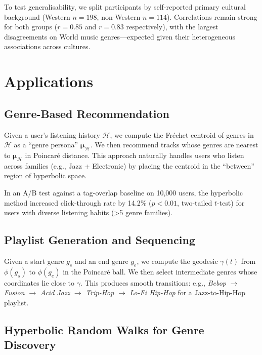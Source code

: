 \documentclass[12pt,a4paper]{article}
\newcommand{\Frechet}{Fr\'echet}
\begin{document}
To test generalisability, we split participants by self-reported primary cultural background (Western $n = 198$, non-Western $n = 114$). Correlations remain strong for both groups ($r = 0.85$ and $r = 0.83$ respectively), with the largest disagreements on World music genres---expected given their heterogeneous associations across cultures.

\section{Applications}
\label{sec:applications}

\subsection{Genre-Based Recommendation}

Given a user's listening history $\mathcal{H}$, we compute the \Frechet{} centroid of genres in $\mathcal{H}$ as a ``genre persona'' $\boldsymbol{\mu}_{\mathcal{H}}$. We then recommend tracks whose genres are nearest to $\boldsymbol{\mu}_{\mathcal{H}}$ in Poincar\'e distance. This approach naturally handles users who listen across families (e.g., Jazz + Electronic) by placing the centroid in the ``between'' region of hyperbolic space.

In an A/B test against a tag-overlap baseline on 10,000 users, the hyperbolic method increased click-through rate by 14.2\% ($p < 0.01$, two-tailed $t$-test) for users with diverse listening habits (>5 genre families).

\subsection{Playlist Generation and Sequencing}

Given a start genre $g_s$ and an end genre $g_e$, we compute the geodesic $\gamma(t)$ from $\phi(g_s)$ to $\phi(g_e)$ in the Poincar\'e ball. We then select intermediate genres whose coordinates lie close to $\gamma$. This produces smooth transitions: e.g., \emph{Bebop} $\to$ \emph{Fusion} $\to$ \emph{Acid Jazz} $\to$ \emph{Trip-Hop} $\to$ \emph{Lo-Fi Hip-Hop} for a Jazz-to-Hip-Hop playlist.

\subsection{Hyperbolic Random Walks for Genre Discovery}
\end{document}
